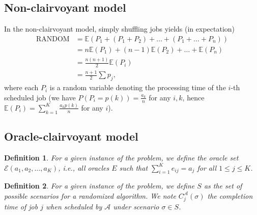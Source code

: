 \documentclass{article}
\newtheorem{definition}{Definition}
\begin{document}
\subsection{Non-clairvoyant model}

In the non-clairvoyant model, simply shuffling jobs yields (in expectation)
\begin{align*}
    \text{RANDOM}&=\mathbb{E}(P_1+(P_1+P_2)+\dots+(P_1+\dots+P_n)) \\
    &=n\mathbb{E}(P_1)+(n-1)\mathbb{E}(P_2)+\dots+\mathbb{E}(P_n) \\
    &=\frac{n(n+1)}{2}\mathbb{E}(P_i) \\
    &=\frac{n+1}{2}\sum p_j,
\end{align*}
where each \(P_i\) is a random variable denoting the processing time of the \(i\)-th scheduled job (we have
\(P(P_i=p(k))=\frac{a_k}{n}\) for any \(i,k\), hence \(\mathbb{E}(P_i)=\sum_{k=1}^{K} \frac{a_k p(k)}{n}\) for any \(i\)).

\subsection{Oracle-clairvoyant model}

\begin{definition}
    For a given instance of the problem, we define the \emph{oracle set} \(\mathcal{E}(a_1,a_2,\ldots,a_K)\), i.e., all oracles \(E\) such that \(\sum_{i=1}^{K} e_{ij}=a_j\) for all \(1\le j\le K\).
\end{definition}

\begin{definition}
    For a given instance of the problem, we define \(S\) as the set of possible scenarios for a randomized algorithm.
    We note \(C^{\mathcal{A}}_j(\sigma)\) the completion time of job \(j\) when scheduled by \(\mathcal{A}\) under scenario \(\sigma\in S\).
\end{definition}

\newcommand{\W}{\mathbb{W}}
\newcommand{\E}{\mathbb{E}}
\end{document}
